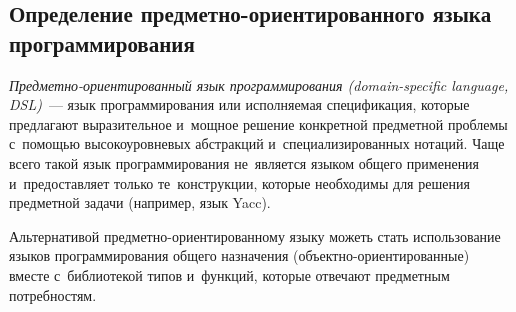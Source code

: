 \subsection{Определение предметно-ориентированного языка программирования} \label{sub121}

\textit{Предметно-ориентированный язык программирования (domain-specific language, DSL)}~--- язык программирования или исполняемая спецификация, которые предлагают выразительное и~мощное решение конкретной предметной проблемы с~помощью высокоуровневых абстракций и~специализированных нотаций. Чаще всего такой язык программирования не~является языком общего применения и~предоставляет только те~конструкции, которые необходимы для решения предметной задачи (например, язык Yacc).

Альтернативой предметно-ориентированному языку можеть стать использование языков программирования общего назначения (объектно-ориентированные) вместе с~библиотекой типов и~функций, которые отвечают предметным потребностям.~\cite{Deursen1998}